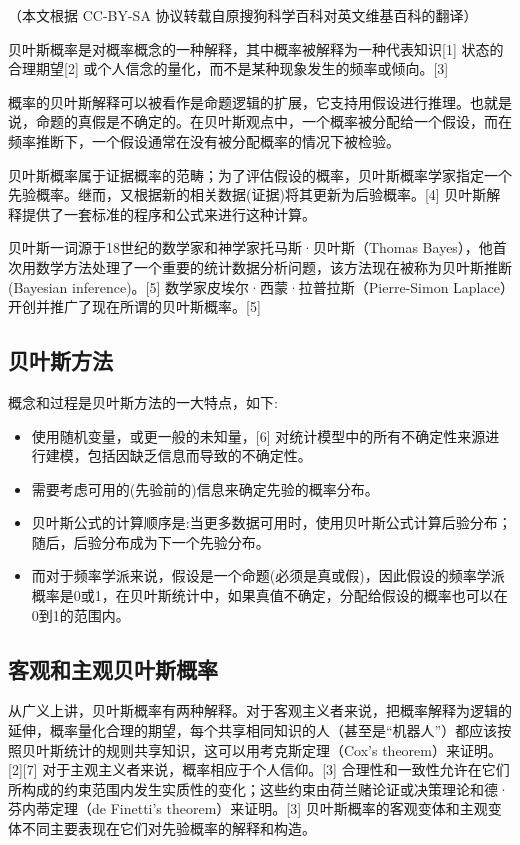 
（本文根据 CC-BY-SA 协议转载自原搜狗科学百科对英文维基百科的翻译）

贝叶斯概率是对概率概念的一种解释，其中概率被解释为一种代表知识[1] 状态的合理期望[2] 或个人信念的量化，而不是某种现象发生的频率或倾向。[3]

概率的贝叶斯解释可以被看作是命题逻辑的扩展，它支持用假设进行推理。也就是说，命题的真假是不确定的。在贝叶斯观点中，一个概率被分配给一个假设，而在频率推断下，一个假设通常在没有被分配概率的情况下被检验。

贝叶斯概率属于证据概率的范畴；为了评估假设的概率，贝叶斯概率学家指定一个先验概率。继而，又根据新的相关数据(证据)将其更新为后验概率。[4] 贝叶斯解释提供了一套标准的程序和公式来进行这种计算。

贝叶斯一词源于18世纪的数学家和神学家托马斯·贝叶斯（Thomas Bayes），他首次用数学方法处理了一个重要的统计数据分析问题，该方法现在被称为贝叶斯推断(Bayesian inference)。[5] 数学家皮埃尔·西蒙·拉普拉斯（Pierre-Simon Laplace）开创并推广了现在所谓的贝叶斯概率。[5]

\subsection{ 贝叶斯方法}

概念和过程是贝叶斯方法的一大特点，如下:

\begin{itemize}
\item 使用随机变量，或更一般的未知量，[6] 对统计模型中的所有不确定性来源进行建模，包括因缺乏信息而导致的不确定性。
\item 需要考虑可用的(先验前的)信息来确定先验的概率分布。
\item 贝叶斯公式的计算顺序是:当更多数据可用时，使用贝叶斯公式计算后验分布；随后，后验分布成为下一个先验分布。
\item 而对于频率学派来说，假设是一个命题(必须是真或假)，因此假设的频率学派概率是0或1，在贝叶斯统计中，如果真值不确定，分配给假设的概率也可以在0到1的范围内。
\end{itemize}

\subsection{客观和主观贝叶斯概率}

从广义上讲，贝叶斯概率有两种解释。对于客观主义者来说，把概率解释为逻辑的延伸，概率量化合理的期望，每个共享相同知识的人（甚至是“机器人”）都应该按照贝叶斯统计的规则共享知识，这可以用考克斯定理（Cox's theorem）来证明。[2][7] 对于主观主义者来说，概率相应于个人信仰。[3] 合理性和一致性允许在它们所构成的约束范围内发生实质性的变化；这些约束由荷兰赌论证或决策理论和德·芬内蒂定理（de Finetti's theorem）来证明。[3] 贝叶斯概率的客观变体和主观变体不同主要表现在它们对先验概率的解释和构造。

